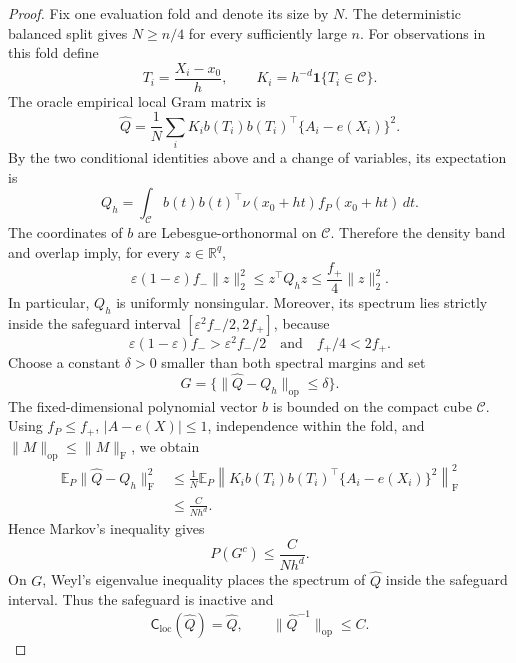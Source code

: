 \documentclass{article}
\begin{document}
\begin{proof}
Fix one evaluation fold and denote its size by \(N\).  The deterministic balanced split gives \(N\geq n/4\) for every sufficiently large \(n\).  For observations in this fold define
\[
T_i=\frac{X_i-x_0}{h},
\qquad
K_i=h^{-d}\mathbf 1\{T_i\in\mathcal C\}.
\]
The oracle empirical local Gram matrix is
\[
\widehat Q
=\frac1N\sum_i K_i b(T_i)b(T_i)^\top\{A_i-e(X_i)\}^2.
\]
By the two conditional identities above and a change of variables, its expectation is
\[
Q_h
=\int_{\mathcal C}b(t)b(t)^\top
\nu(x_0+ht)f_P(x_0+ht)\,dt.
\]
The coordinates of \(b\) are Lebesgue-orthonormal on \(\mathcal C\).  Therefore the density band and overlap imply, for every \(z\in\mathbb R^q\),
\[
\varepsilon(1-\varepsilon)f_-\lVert z\rVert_2^2
\leq z^\top Q_hz
\leq \frac{f_+}{4}\lVert z\rVert_2^2.
\]
In particular, \(Q_h\) is uniformly nonsingular.  Moreover, its spectrum lies strictly inside the safeguard interval \([\varepsilon^2f_-/2,2f_+]\), because
\[
\varepsilon(1-\varepsilon)f_->\varepsilon^2f_-/2
\quad\text{and}\quad
f_+/4<2f_+.
\]
Choose a constant \(\delta>0\) smaller than both spectral margins and set
\[
G=\{\lVert\widehat Q-Q_h\rVert_{\mathrm{op}}\leq\delta\}.
\]
The fixed-dimensional polynomial vector \(b\) is bounded on the compact cube \(\mathcal C\).  Using \(f_P\leq f_+\), \(|A-e(X)|\leq1\), independence within the fold, and \(\lVert M\rVert_{\mathrm{op}}\leq\lVert M\rVert_{\mathrm F}\), we obtain
\[
\begin{aligned}
\mathbb E_P\lVert\widehat Q-Q_h\rVert_{\mathrm F}^2
&\leq \frac{1}{N}\mathbb E_P
 \left\lVert K_i b(T_i)b(T_i)^\top\{A_i-e(X_i)\}^2\right\rVert_{\mathrm F}^2\\
&\leq \frac{C}{Nh^d}.
\end{aligned}
\]
Hence Markov's inequality gives
\[
P(G^c)\leq\frac{C}{Nh^d}.
\]
On \(G\), Weyl's eigenvalue inequality places the spectrum of \(\widehat Q\) inside the safeguard interval.  Thus the safeguard is inactive and
\[
\mathsf C_{\mathrm{loc}}(\widehat Q)=\widehat Q,
\qquad
\lVert\widehat Q^{-1}\rVert_{\mathrm{op}}\leq C.
\]


\end{proof}
\end{document}
